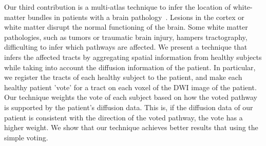 \documentclass[a4paper, 10pt]{article}
\begin{document}
Our third contribution is a multi-atlas technique to infer the location of 
white-matter bundles in patients with a brain pathology~\cite{Guillermo2018}.
Lesions in the cortex or white matter disrupt the normal functioning of the
brain. Some white matter pathologies, such as tumors or traumatic brain injury,
hampers tractography, difficulting to infer which pathways are affected. We 
present a technique that infers the affected tracts by aggregating spatial
information from healthy subjects while taking into account the diffusion
information of the patient. In particular, we register the tracts of each
healthy subject to the patient, and make each healthy patient 'vote' for a
tract on each voxel of the DWI image of the patient. Our technique weights the
vote of each subject based on how the voted pathway is supported by the patient's 
diffusion data. This is, if the diffusion data of our patient is consistent with
the direction of the voted pathway, the vote has a higher weight. We show that
our technique achieves better results that using the simple voting.



\end{document}
